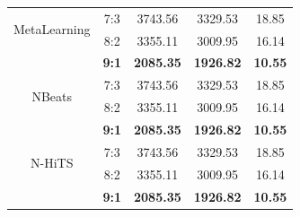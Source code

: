 \begin{table}[H]
\begin{tabular}{|c|c|c|c|c|}
         \hline
         \multirow{2}{*}{MetaLearning} & 7:3 & 3743.56&3329.53&18.85\\ & 8:2 & 3355.11&3009.95&16.14 \\ & \textbf{9:1} & \textbf{2085.35} & \textbf{1926.82} & \textbf{10.55}\\
         \hline
         \multirow{2}{*}{NBeats} & 7:3 & 3743.56&3329.53&18.85\\ & 8:2 & 3355.11&3009.95&16.14 \\ & \textbf{9:1} & \textbf{2085.35} & \textbf{1926.82} & \textbf{10.55}\\
         \hline
         \multirow{2}{*}{N-HiTS} & 7:3 & 3743.56&3329.53&18.85\\ & 8:2 & 3355.11&3009.95&16.14 \\ & \textbf{9:1} & \textbf{2085.35} & \textbf{1926.82} & \textbf{10.55}\\
         \hline
    \end{tabular}
    \label{bidvresult}
\end{table}

